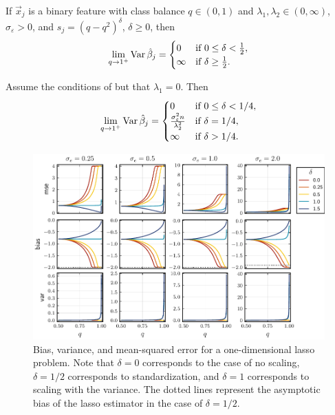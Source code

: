 \begin{theorem}
  \label{thm:classbalance-variance}
  If \(\vec{x}_j\) is a binary feature with class balance \(q \in (0, 1)\) and \(\lambda_1,\lambda_2 \in (0,\infty)\), \(\sigma_\varepsilon > 0\), and \(s_j = (q - q^2)^{\delta}\), \(\delta \geq 0\), then
  \[
    \lim_{q \rightarrow 1^+} \operatorname{Var} \hat{\beta}_j =
    \begin{cases}
      0      & \text{if } 0 \leq \delta < \frac{1}{2}, \\
      \infty & \text{if } \delta \geq \frac{1}{2}.
    \end{cases}
  \]
\end{theorem}

\begin{corollary}
  \label{cor:ridge-variance}
  Assume the conditions of  but that \(\lambda_1 = 0\). Then
  \[
    \lim_{q \rightarrow 1^+} \operatorname{Var} \hat{\beta}_j =
    \begin{cases}
      0                                          & \text{if } 0 \leq \delta < 1/4, \\
      \frac{\sigma_\varepsilon^2 n}{\lambda_2^2} & \text{if } \delta = 1/4,        \\
      \infty                                     & \text{if } \delta > 1/4.
    \end{cases}
  \]
\end{corollary}

\begin{figure}[htpb]
  \centering
  \includegraphics[]{plots/bias-var-onedim.pdf}
  \caption{%
    Bias, variance, and mean-squared error for a one-dimensional lasso problem.
    Note that \(\delta = 0\) corresponds to the case of no scaling, \(\delta = 1/2\) corresponds
    to standardization, and \(\delta = 1\) corresponds to scaling with the variance. The dotted
    lines represent the asymptotic bias of the lasso estimator in the case of \(\delta = 1/2\).
  }
  \label{fig:bias-var-onedim-lasso}
\end{figure}

